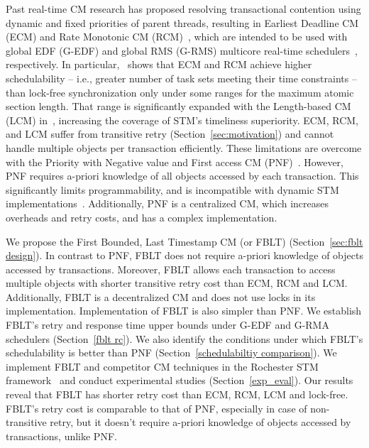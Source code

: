 \documentclass[conference]{IEEEtran}
\begin{document}
Past real-time CM research 
has proposed resolving transactional contention using dynamic and fixed priorities of parent threads, resulting in Earliest Deadline CM (ECM) and Rate Monotonic CM (RCM)~\cite{6045438,stmconcurrencycontrol:emsoft11,lcmdac2012}, which are intended to be used with global EDF (G-EDF) and global RMS (G-RMS) multicore real-time schedulers~\cite{Davis:2011:SHR:1978802.1978814}, respectively.
In particular,~\cite{stmconcurrencycontrol:emsoft11} shows that ECM and RCM achieve higher schedulability -- i.e., greater number of task sets meeting their time constraints -- than lock-free synchronization only under some ranges for the maximum atomic section length. That range is significantly expanded with the Length-based CM (LCM) in~\cite{lcmdac2012}, increasing the coverage of STM's timeliness superiority. ECM, RCM, and LCM suffer from transitive retry (Section~\ref{sec:motivation}) and cannot handle multiple objects per transaction efficiently. These limitations are overcome with the Priority with Negative value and First access CM (PNF)~\cite{pnf_dac_asp,shambake_phd_proposal}. However, PNF requires a-priori knowledge of all objects accessed by each transaction. This significantly limits programmability, and is incompatible with dynamic STM implementations~\cite{Herlihy:2003:STM:872035.872048}. Additionally, PNF is a centralized CM, which increases overheads and retry costs, and has a complex implementation. 

We propose the First Bounded, Last Timestamp CM (or FBLT) (Section~\ref{sec:fblt design}). In contrast to PNF, FBLT does not require a-priori knowledge of objects accessed by transactions. Moreover, FBLT allows each transaction to access multiple objects with shorter transitive retry cost than ECM, RCM and LCM. Additionally, FBLT is a decentralized CM and does not use locks in its implementation. Implementation of FBLT is also simpler than PNF. We establish FBLT's retry and response time upper bounds under G-EDF and G-RMA schedulers (Section~\ref{fblt rc}). We also identify the conditions under which FBLT's schedulability is better than PNF (Section~\ref{schedulabiltiy comparison}). We implement FBLT and competitor CM techniques in the Rochester STM framework~\cite{marathe2006lowering} and conduct experimental studies (Section~\ref{exp_eval}). Our results reveal that FBLT has shorter retry cost than ECM, RCM, LCM and lock-free. FBLT's retry cost is comparable to that of PNF, especially in case of non-transitive retry, but it doesn't require a-priori knowledge of objects accessed by transactions, unlike PNF. 
\end{document}
